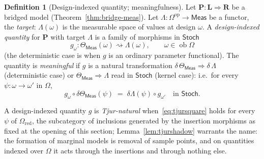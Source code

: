 \documentclass[11pt,a4paper]{article}
\theoremstyle{plain}
\theoremstyle{definition}
\newtheorem{definition}[theorem]{Definition}
\theoremstyle{remark}
\newcommand{\cat}[1]{\mathsf{#1}}
\newcommand{\catO}{\cat{\Omega}}
\newcommand{\Meas}{\cat{Meas}}
\newcommand{\Stoch}{\cat{Stoch}}
\newcommand{\op}{\mathrm{op}}
\newcommand{\del}{\delta}
\DeclareMathOperator{\ob}{ob}
\begin{document}
\begin{definition}[Design-indexed quantity; meaningfulness]\label{def:meaningful}
Let $\mathbf{P} \colon \mathbf{L} \Rightarrow \mathbf{R}$ be a bridged model
(Theorem~\ref{thm:bridge-meas}). Let
$\Lambda \colon \catO^{\op} \to \Meas$ be a functor, the \emph{target}:
$\Lambda(\omega)$ is the measurable space of values at design $\omega$. A
\emph{design-indexed quantity} for $\mathbf P$ with target
$\Lambda$ is a family of morphisms in $\Stoch$
\[
g_{\omega} \colon \Theta_\Meas(\omega) \rightsquigarrow \Lambda(\omega),
\qquad \omega \in \ob\catO
\]
(the deterministic case is when $g$ is an ordinary parameter functional). The
quantity is \emph{meaningful} if $g$ is a natural transformation
$\del\,\Theta_\Meas \Rightarrow \del\,\Lambda$ (deterministic case) or
$\Theta_\Meas \Rightarrow \Lambda$ read in $\Stoch$ (kernel case): i.e.\ for
every $\psi \colon \omega \to \omega'$ in $\catO$,
\begin{equation}\label{eq:tjursquare}
g_{\omega} \circ \del\Theta_\Meas(\psi) \;=\; \del\Lambda(\psi) \circ
g_{\omega'}
\quad\text{in } \Stoch .
\end{equation}
\end{definition}

A design-indexed quantity $g$ is \emph{Tjur-natural} when~\eqref{eq:tjursquare}
holds for every $\psi$ of $\catO_{\mathrm{red}}$, the subcategory of
inclusions generated by the insertion morphisms as fixed at the opening of
this section; Lemma~\ref{lem:tjurshadow}
warrants the name: the formation of marginal models is removal of sample
points, and on quantities indexed over $\catO$ it acts through the
insertions and through nothing else.
\end{document}
